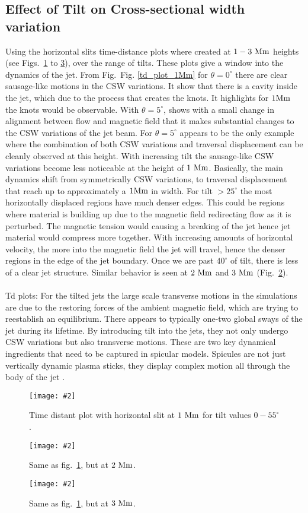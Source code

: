 \documentclass[12pt]{ociamthesis}
\newcommand{\fref}[1]{Fig. \eqref{#1}}
\newcommand{\mfig}[4]{
  \begin{figure}
  \begin{center}
  \texttt{[image: \#2]}
  \caption{#3}
  \label{#4}
  \end{center}
  \end{figure}}
\newcommand{\np}{\\ \\}
\newcommand{\degs}{^{\circ}}
\begin{document}
\subsection{Effect of Tilt on Cross-sectional width variation}
\label{subsec:oscillating}
Using the horizontal slits time-distance plots where created at $1-3~\rm{Mm}$ heights (see Figs.~\ref{td_plot_1Mm} to \ref{td_plot_3Mm}), over the range of tilts. These plots give a window into the dynamics of the jet. From Fig.~\fref{td_plot_1Mm} for $\theta=0^{\circ}$ there are clear sausage-like motions in the CSW variations. It show that there is a cavity inside the jet, which due to the process that creates the knots. It highlights for $1\rm{Mm}$  the knots would be observable. With $\theta=5^{\circ}$, shows with a small change in alignment between flow and magnetic field that it makes substantial changes to the CSW variations of the jet beam. For $\theta=5^{\circ}$ appears to be the only example where the combination of both CSW variations and traversal displacement can be cleanly observed at this height. With increasing tilt the sausage-like CSW variations become less noticeable at the height of $1~\rm{Mm}$. Basically, the main dynamics shift from symmetrically CSW variations, to traversal displacement that reach up to approximately a $1\rm{Mm}$ in width. For tilt $>25\degs$ the most horizontally displaced regions have much denser edges. This could be regions where material is building up due to the magnetic field redirecting flow as it is perturbed. The magnetic tension would causing a breaking of the jet hence jet material would compress more together. With increasing amounts of horizontal velocity, the more into the magnetic field the jet will travel, hence the denser regions in the edge of the jet boundary. Once we are past $40\degs$ of tilt, there is less of a clear jet structure. Similar behavior is seen at $2~\rm{Mm}$ and $3~\rm{Mm}$ (Fig.~\ref{td_plot_2Mm}). \np
Td plots: For the tilted jets the large scale transverse motions in the simulations are due to the restoring forces of the ambient magnetic field, which are trying to reestablish an equilibrium. There appears to typically one-two global sways of the jet during its lifetime.   
By introducing tilt into the jets, they not only undergo CSW variations but also transverse motions. These are two key dynamical ingredients that need to be captured in spicular models. Spicules are not just vertically dynamic plasma sticks, they display complex motion all through the body of the jet \citep{Sharma2018ApJ85361S}.
%
\mfig{1}{figures/td_plot_1Mm.png}{Time distant plot with horizontal slit at $1~\rm{Mm}$ for tilt values $0-55^{\circ}$.}{td_plot_1Mm}
%
\mfig{1}{figures/td_plot_2Mm.png}{Same as fig.~\ref{td_plot_1Mm}, but at $2~\rm{Mm}$.}{td_plot_2Mm}
\mfig{1}{figures/td_plot_3Mm.png}{Same as fig.~\ref{td_plot_1Mm}, but at $3~\rm{Mm}$.}{td_plot_3Mm}
\end{document}
